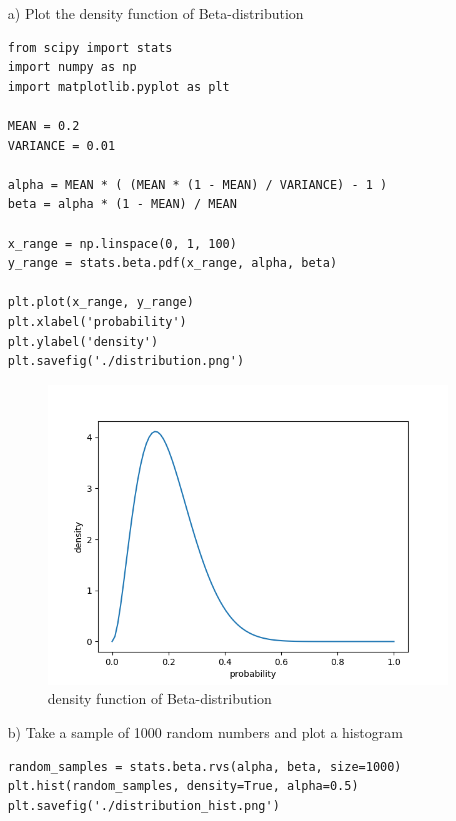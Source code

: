 \documentclass{article}
\begin{document}
\begin{itemize}
\item[a)] Plot the density function of Beta-distribution
\begin{verbatim}
from scipy import stats
import numpy as np
import matplotlib.pyplot as plt

MEAN = 0.2
VARIANCE = 0.01

alpha = MEAN * ( (MEAN * (1 - MEAN) / VARIANCE) - 1 )
beta = alpha * (1 - MEAN) / MEAN

x_range = np.linspace(0, 1, 100)
y_range = stats.beta.pdf(x_range, alpha, beta)

plt.plot(x_range, y_range)
plt.xlabel('probability')
plt.ylabel('density')
plt.savefig('./distribution.png')
\end{verbatim}

\begin{figure}[H]
\centering  
\includegraphics[scale=0.6]{distribution.png}
\caption{ density function of Beta-distribution}
\label{fig: label}
\end{figure}

\item[b)] Take a sample of 1000 random numbers and plot a histogram     
\begin{verbatim}
random_samples = stats.beta.rvs(alpha, beta, size=1000)
plt.hist(random_samples, density=True, alpha=0.5)
plt.savefig('./distribution_hist.png')
\end{verbatim}


\end{itemize}
\end{document}
